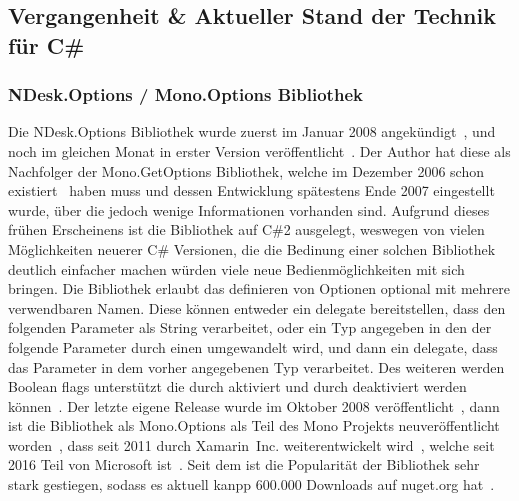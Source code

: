  \subsection{Vergangenheit \& Aktueller Stand der Technik f\"ur C\#}\label{subsec:CurrentState}
 \subsubsection{NDesk.Options / Mono.Options Bibliothek}
 Die NDesk.Options Bibliothek wurde zuerst im Januar 2008 angekündigt~\cite{NDeskAnnouncement},
 und noch im gleichen Monat in erster Version veröffentlicht~\cite{NDesk1stRelease}.
 Der Author hat diese als Nachfolger der Mono.GetOptions Bibliothek,
 welche im Dezember 2006 schon existiert~\cite{MonoGetOptions3rdBlogPost} haben muss und dessen Entwicklung spätestens Ende 2007 eingestellt wurde,
 über die jedoch wenige Informationen vorhanden sind.
 Aufgrund dieses frühen Erscheinens ist die Bibliothek auf C\#2 ausgelegt, weswegen von vielen Möglichkeiten neuerer C\# Versionen,
 die die Bedinung einer solchen Bibliothek deutlich einfacher machen würden viele neue Bedienmöglichkeiten mit sich bringen.
 Die Bibliothek erlaubt das definieren von Optionen optional mit mehrere verwendbaren Namen.
 Diese können entweder ein delegate bereitstellen, dass den folgenden Parameter als String verarbeitet,
 oder ein Typ angegeben in den der folgende Parameter durch einen  umgewandelt wird,
 und dann ein delegate, dass das Parameter in dem vorher angegebenen Typ verarbeitet.
 Des weiteren werden Boolean flags unterstützt die durch  aktiviert
 und durch  deaktiviert werden können~\cite{NDeskOptionSetDocumentation}.
 Der letzte eigene Release wurde im Oktober 2008 veröffentlicht~\cite{NDeskOptionsLastRelease},
 dann ist die Bibliothek als Mono.Options als Teil des Mono Projekts neuveröffentlicht worden~\cite{MonoOptions1stCommit},
 dass seit 2011 durch Xamarin~Inc. weiterentwickelt wird~\cite{MonoFutureInterview}, welche seit 2016 Teil von Microsoft ist~\cite{MicrosoftBlogAcquireXamarin}.
 Seit dem ist die Popularität der Bibliothek sehr stark gestiegen, sodass es aktuell kanpp 600.000 Downloads auf nuget.org hat~\cite{MonoOptionsNuget}.
